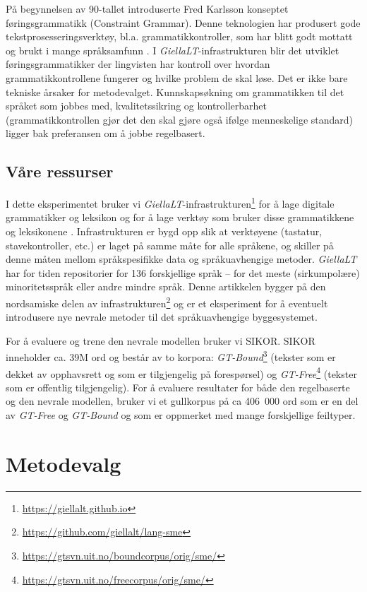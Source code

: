 \documentclass{flammie}
\begin{document}
På begynnelsen av 90-tallet introduserte Fred Karlsson konseptet
føringsgrammatikk (Constraint Grammar).  Denne teknologien har produsert gode
tekstprosesseringsverktøy, bl.a. grammatikkontroller, som har blitt godt mottatt
og brukt i mange språksamfunn \cite{Arppe2000,Birn2000,Hagen2001b}.  I
\textit{GiellaLT}-infrastrukturen blir det utviklet føringsgrammatikker der
lingvisten har kontroll over hvordan grammatikkontrollene fungerer og hvilke
problem de skal løse. Det er ikke bare tekniske årsaker for metodevalget.
Kunnskapsøkning om grammatikken til det språket som jobbes med, kvalitetssikring
og kontrollerbarhet (grammatikkontrollen gjør det den skal gjøre også ifølge
menneskelige standard) ligger bak preferansen om å jobbe regelbasert.

\subsection{Våre ressurser}

I dette eksperimentet bruker vi
\textit{GiellaLT}-infrastrukturen\footnote{\url{https://giellalt.github.io}} for
å lage digitale grammatikker og leksikon og for å lage verktøy som bruker disse
grammatikkene og leksikonene \cite{moshagen2014open}.  Infrastrukturen er bygd
opp slik at verktøyene  (tastatur, stavekontroller, etc.) er laget på samme måte
for alle språkene, og skiller på denne måten mellom språkspesifikke data og
språkuavhengige metoder.  \textit{GiellaLT} har for tiden repositorier for 136
forskjellige språk -- for det meste (sirkumpolære) minoritetsspråk eller andre
mindre språk.  Denne artikkelen bygger på den nordsamiske delen av
infrastrukturen\footnote{\url{https://github.com/giellalt/lang-sme}} og er et
eksperiment for å eventuelt introdusere nye nevrale metoder til det
språkuavhengige byggesystemet.

For å evaluere og trene den nevrale modellen bruker vi SIKOR.  SIKOR inneholder
ca. 39M ord og består av to korpora:
\textit{GT-Bound}\footnote{\url{https://gtsvn.uit.no/boundcorpus/orig/sme/}}
(tekster som er dekket av opphavsrett og som er tilgjengelig på forespørsel) og
\textit{GT-Free}\footnote{\url{https://gtsvn.uit.no/freecorpus/orig/sme/}}
(tekster som er offentlig tilgjengelig).  For å evaluere resultater for både den
regelbaserte og den nevrale modellen, bruker vi et gullkorpus på ca 406~000 ord
som er en del av \textit{GT-Free} og \textit{GT-Bound} og som er oppmerket med
mange forskjellige feiltyper.


\section{Metodevalg}
\end{document}
